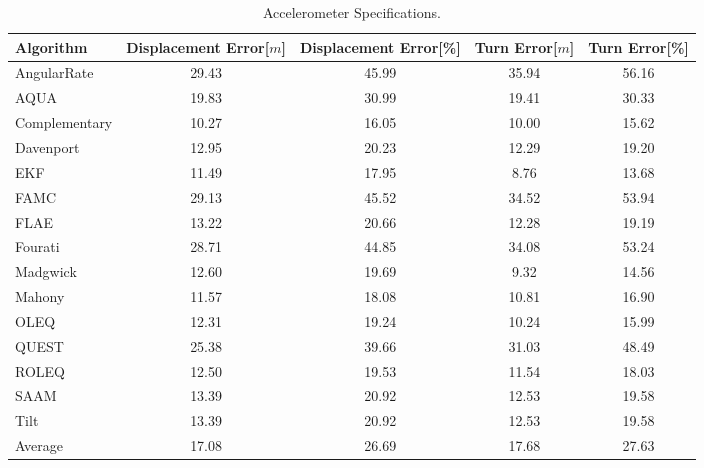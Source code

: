 \begin{table}[H]
    \begin{center}
        \begin{tabular}[t]{lcccc}
            \hline
            Algorithm                   & Displacement Error[$m$] & Displacement Error[\%]      & Turn Error[$m$]  & Turn Error[\%]             \\
            \hline 
            AngularRate            & 29.43  & 45.99 & 35.94 & 56.16              \\            AQUA            & 19.83  & 30.99 & 19.41 & 30.33              \\            Complementary            & 10.27  & 16.05 & 10.00 & 15.62              \\            Davenport            & 12.95  & 20.23 & 12.29 & 19.20              \\            EKF            & 11.49  & 17.95 & 8.76 & 13.68              \\            FAMC            & 29.13  & 45.52 & 34.52 & 53.94              \\            FLAE            & 13.22  & 20.66 & 12.28 & 19.19              \\            Fourati            & 28.71  & 44.85 & 34.08 & 53.24              \\            Madgwick            & 12.60  & 19.69 & 9.32 & 14.56              \\            Mahony            & 11.57  & 18.08 & 10.81 & 16.90              \\            OLEQ            & 12.31  & 19.24 & 10.24 & 15.99              \\            QUEST            & 25.38  & 39.66 & 31.03 & 48.49              \\            ROLEQ            & 12.50  & 19.53 & 11.54 & 18.03              \\            SAAM            & 13.39  & 20.92 & 12.53 & 19.58              \\            Tilt            & 13.39  & 20.92 & 12.53 & 19.58              \\
            \hline
            Average & 17.08 & 26.69 & 17.68 & 27.63
        \end{tabular}
        \caption{Accelerometer Specifications. }
        \label{tab:accelerometer_specification}
    \end{center}
\end{table}